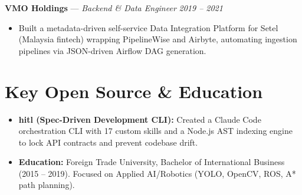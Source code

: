 \documentclass[8.5pt,a4paper]{extarticle}
\begin{document}
\vspace{2pt}
\noindent\textbf{VMO Holdings} --- \textit{Backend \& Data Engineer} \hfill \textit{2019 -- 2021}
\begin{itemize}
    \item Built a metadata-driven self-service Data Integration Platform for Setel (Malaysia fintech) wrapping PipelineWise and Airbyte, automating ingestion pipelines via JSON-driven Airflow DAG generation.
\end{itemize}

\vspace{2pt}
\section*{Key Open Source \& Education}
\begin{itemize}
    \item \textbf{hitl (Spec-Driven Development CLI):} Created a Claude Code orchestration CLI with 17 custom skills and a Node.js AST indexing engine to lock API contracts and prevent codebase drift.
    \item \textbf{Education:} Foreign Trade University, Bachelor of International Business (2015 -- 2019). Focused on Applied AI/Robotics (YOLO, OpenCV, ROS, A* path planning).
\end{itemize}
\end{document}
